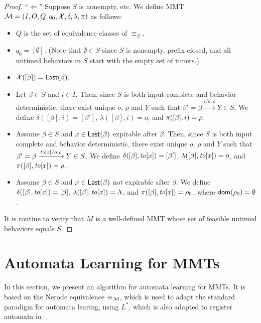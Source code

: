 \begin{proof}
``$\Leftarrow$'' Suppose $S$ is nonempty, etc.
We define MMT ${\cal M} = (I, O, Q, q_0, \mathcal{X}, \delta, \lambda, \pi)$ as follows:
\begin{itemize}
\item
$Q$ is the set of equivalence classes of $\equiv_S$,
\item
$q_0 = [\emptyset]$. (Note that $\emptyset \in S$ since $S$ is nonempty, prefix closed, and all untimed behaviors in $S$ start
with the empty set of timers.)
\item
$\mathcal{X}([\beta]) = \mathsf{Last}({\beta})$.
\item
Let $\beta \in S$ and $i \in I$. Then, since $S$ is both input complete and behavior deterministic, there exist unique
$o$, $\rho$ and $Y$ such that $\beta' = \beta \xrightarrow{i/o, \rho} Y \in S$.
We define $\delta([\beta],i) = [\beta']$, $\lambda([\beta],i) = o$, and $\pi([\beta],i) = \rho$.
\item
Assume $\beta \in S$ and $x\in \mathsf{Last}({\beta})$ expirable after $\beta$. 
Then, since $S$ is both input complete and behavior deterministic, there exist unique
$o$, $\rho$ and $Y$ such that $\beta' = \beta \xrightarrow{\mathit{to}[x]/o, \rho} Y \in S$.
We define $\delta([\beta],\mathit{to}[x]) = [\beta']$, $\lambda([\beta],\mathit{to}[x]) = o$, and $\pi([\beta],\mathit{to}[x]) = \rho$.
\item
Assume $\beta \in S$ and $x \in \mathsf{Last}({\beta})$ not expirable after $\beta$.
We define $\delta([\beta],\mathit{to}[x]) = [\beta]$, $\lambda([\beta],\mathit{to}[x]) = \Lambda$, and $\pi([\beta],\mathit{to}[x]) = \rho_0$, where ${\textsf{dom}}(\rho_0) = \emptyset$.
\end{itemize}
It is routine to verify that $M$ is a well-defined MMT whose set of feasible untimed behaviors equals $S$.
\end{proof}



\section{Automata Learning for MMTs}
In this section, we present an algorithm for automata learning for MMTs.
It is based on the Nerode equivalence $\equiv_{{\cal M}}$, which is used to adapt
the standard paradigm for automata learing, using $L^*$, which is also adapted
to register automata in~\cite{CasselHJS16}. 

